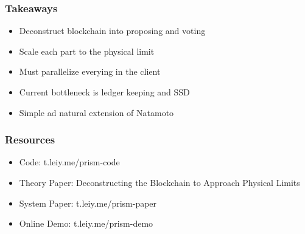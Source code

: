 \documentclass[aspectratio=169]{beamer}
\begin{document}
\begin{frame}
    \frametitle{Takeaways}
    \begin{itemize}
        \item Deconstruct blockchain into \alert{proposing} and \alert{voting}
        \item Scale each part to the physical limit
        \item Must parallelize everying in the client
        \item Current bottleneck is ledger keeping and SSD
        \item Simple ad natural extension of Natamoto
    \end{itemize}
\end{frame}

\begin{frame}
    \frametitle{Resources}
    \begin{itemize}
        \item \alert{Code}: t.leiy.me/prism-code
        \item \alert{Theory Paper}: Deconstructing the Blockchain to Approach Physical Limits
        \item \alert{System Paper}: t.leiy.me/prism-paper
        \item \alert{Online Demo}: t.leiy.me/prism-demo
    \end{itemize}
\end{frame}
\end{document}
